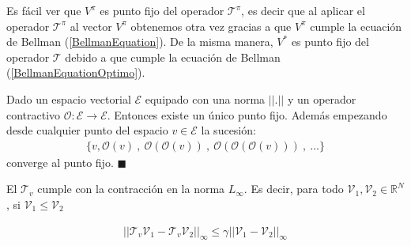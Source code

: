 Es fácil ver que $V^\pi$ es punto fijo del operador $\mathcal{T}^\pi$, es decir que al aplicar el operador $\mathcal{T}^\pi$ al vector $V^\pi$ obtenemos otra vez gracias a que $V^\pi$ cumple la ecuación de Bellman (\ref{BellmanEquation}). De la misma manera, $V^* $ es punto fijo del operador $\mathcal{T}$ debido a que cumple la ecuación de Bellman (\ref{BellmanEquationOptimo}).


\begin{thm}
    Dado un espacio vectorial $\mathcal{E}$ equipado con una norma $||.||$ y un operador contractivo $\mathcal{O}:\mathcal{E} \rightarrow \mathcal{E}$. Entonces existe un único punto fijo. Además empezando desde cualquier punto del espacio $v \in \mathcal{E}$ la sucesión:
    \begin{gather}
        \{ v,\mathcal{O}(v) \ , \ \mathcal{O}(\mathcal{O}(v)) \ , \ \mathcal{O}(\mathcal{O}(\mathcal{O}(v))) \ , \ ... \}
    \end{gather}
    converge al punto fijo.
    \hfill\ensuremath{\blacksquare}

\end{thm}


El $\mathcal{T}_v$ cumple con la contracción en la norma $L_\infty$. Es decir, para todo $\mathcal{V}_1,\mathcal{V}_2 \in \mathbb{R}^N$ , si $\mathcal{V}_1 \leq \mathcal{V}_2$


\begin{gather}
    || \mathcal{T}_v\mathcal{V}_1  - \mathcal{T}_v \mathcal{V}_2||_\infty \leq \gamma || \mathcal{V}_1 - \mathcal{V}_2||_\infty
\end{gather}


